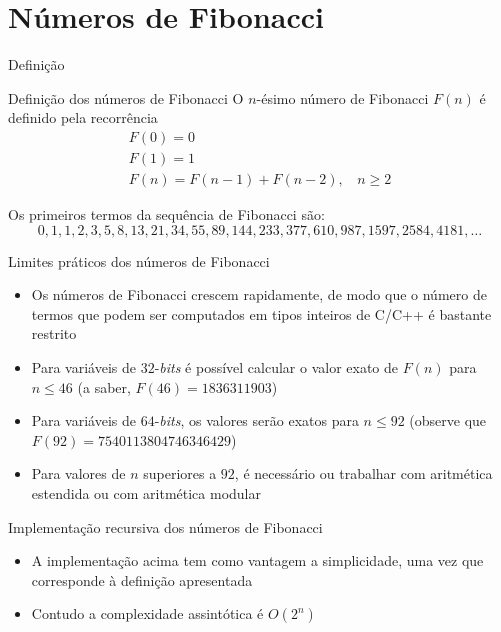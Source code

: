 \section{Números de Fibonacci}

\begin{frame}[fragile]{Definição}

    \begin{block}{Definição dos números de Fibonacci}
        O $n$-ésimo número de Fibonacci $F(n)$ é definido pela recorrência
$$
\begin{array}{l}
        F(0) = 0\\
        F(1) = 1\\
        F(n) = F(n - 1) + F(n - 2),\ \ \ \ n \geq 2
\end{array}
$$
    \end{block}

    \vspace{0.1in}

    Os primeiros termos da sequência de Fibonacci são:
$$
    0, 1, 1, 2, 3, 5, 8, 13, 21, 34, 55, 89, 144, 233, 377, 610, 987, 1597, 2584, 4181, \ldots
$$
\end{frame}

\begin{frame}[fragile]{Limites práticos dos números de Fibonacci}

    \begin{itemize}
        \item Os números de Fibonacci crescem rapidamente, de modo que o número de termos que podem 
            ser computados em tipos inteiros de C/C++ é bastante restrito

        \item Para variáveis de $32$-\textit{bits} é possível calcular o valor exato de $F(n)$ para 
            $n\leq 46$ (a saber, $F(46) = 1836311903$)

        \item Para variáveis de $64$-\textit{bits}, os valores serão exatos para $n\leq 92$ 
            (observe que $F(92) = 7540113804746346429$)

        \item Para valores de $n$ superiores a $92$, é necessário ou trabalhar com aritmética 
            estendida ou com aritmética modular
    \end{itemize}

\end{frame}

\begin{frame}[fragile]{Implementação recursiva dos números de Fibonacci}

    \begin{itemize}

        \item A implementação acima tem como vantagem a simplicidade, uma vez que corresponde à
            definição apresentada

        \item Contudo a complexidade assintótica é $O(2^n)$
    \end{itemize}

\end{frame}

